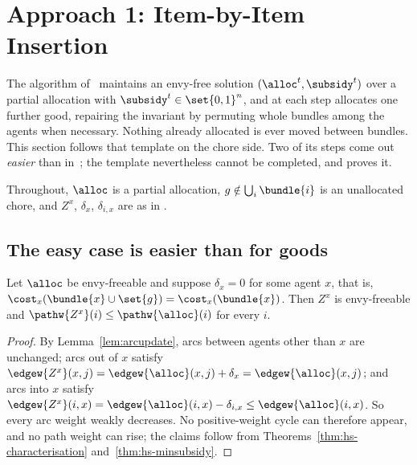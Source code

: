 \section{Approach 1: Item-by-Item Insertion}
\label{sec:approach1}

The algorithm of~\cite{BKNS22} maintains an envy-free solution
$(\alloc^t, \subsidy^t)$ over a partial allocation with
$\subsidy^t \in \set{0,1}^n$, and at each step allocates one further good,
repairing the invariant by permuting whole bundles among the agents when
necessary. Nothing already allocated is ever moved between bundles. This section
follows that template on the chore side. Two of its steps come out
\emph{easier} than in~\cite{BKNS22}; the template nevertheless cannot be
completed, and  proves it.

Throughout, $\alloc$ is a partial allocation, $g \notin \bigcup_i \bundle{i}$ is
an unallocated chore, and $Z^x$, $\delta_x$, $\delta_{i,x}$ are as in
.

\subsection{The easy case is easier than for goods}

\begin{theorem}
\label{thm:freeinsert}
Let $\alloc$ be envy-freeable and suppose $\delta_x = 0$ for some agent $x$,
that is, $\cost_x(\bundle{x} \cup \set{g}) = \cost_x(\bundle{x})$. Then $Z^x$ is
envy-freeable and $\pathw{Z^x}(i) \le \pathw{\alloc}(i)$ for every $i$.
\end{theorem}

\begin{proof}
By Lemma~\ref{lem:arcupdate}, arcs between agents other than $x$ are unchanged;
arcs out of $x$ satisfy $\edgew{Z^x}(x,j) = \edgew{\alloc}(x,j) + \delta_x =
\edgew{\alloc}(x,j)$; and arcs into $x$ satisfy $\edgew{Z^x}(i,x) =
\edgew{\alloc}(i,x) - \delta_{i,x} \le \edgew{\alloc}(i,x)$. So every arc weight
weakly decreases. No positive-weight cycle can therefore appear, and no path
weight can rise; the claims follow from
Theorems~\ref{thm:hs-characterisation} and~\ref{thm:hs-minsubsidy}.
\end{proof}

